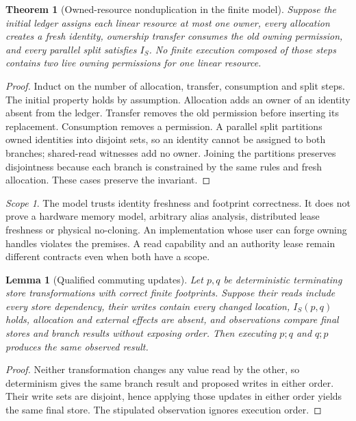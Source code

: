\documentclass[11pt]{article}
\newtheorem{theorem}[definition]{Theorem}
\newtheorem{lemma}[definition]{Lemma}
\theoremstyle{remark}
\newtheorem{remark}[definition]{Scope}
\begin{document}
\begin{theorem}[Owned-resource nonduplication in the finite model]
Suppose the initial ledger assigns each linear resource at most one owner,
every allocation creates a fresh identity, ownership transfer consumes the
old owning permission, and every parallel split satisfies $I_S$. No finite
execution composed of those steps contains two live owning permissions for
one linear resource.
\end{theorem}
\begin{proof}
Induct on the number of allocation, transfer, consumption and split steps.
The initial property holds by assumption. Allocation adds an owner of an
identity absent from the ledger. Transfer removes the old permission before
inserting its replacement. Consumption removes a permission. A parallel
split partitions owned identities into disjoint sets, so an identity cannot
be assigned to both branches; shared-read witnesses add no owner. Joining
the partitions preserves disjointness because each branch is constrained by
the same rules and fresh allocation. These cases preserve the invariant.
\end{proof}

\begin{remark}
The model trusts identity freshness and footprint correctness. It does not
prove a hardware memory model, arbitrary alias analysis, distributed lease
freshness or physical no-cloning. An implementation whose user can forge
owning handles violates the premises. A read capability and an authority
lease remain different contracts even when both have a scope.
\end{remark}

\begin{lemma}[Qualified commuting updates]
Let $p,q$ be deterministic terminating store transformations with correct
finite footprints. Suppose their reads include every store dependency,
their writes contain every changed location, $I_S(p,q)$ holds, allocation
and external effects are absent, and observations compare final stores and
branch results without exposing order. Then executing $p;q$ and $q;p$
produces the same observed result.
\end{lemma}
\begin{proof}
Neither transformation changes any value read by the other, so determinism
gives the same branch result and proposed writes in either order. Their
write sets are disjoint, hence applying those updates in either order yields
the same final store. The stipulated observation ignores execution order.
\end{proof}
\end{document}
